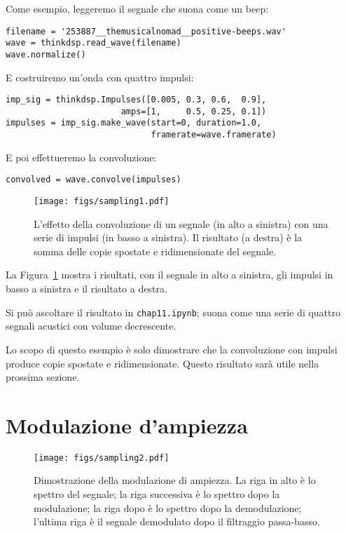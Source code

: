 \documentclass[12pt,a4paper]{book}
\begin{document}
Come esempio, leggeremo il segnale che suona come un beep:

\begin{verbatim} 
filename = '253887__themusicalnomad__positive-beeps.wav'
wave = thinkdsp.read_wave(filename)
wave.normalize()
 \end{verbatim} 

E costruiremo un'onda con quattro impulsi:

\begin{verbatim} 
imp_sig = thinkdsp.Impulses([0.005, 0.3, 0.6,  0.9],
                       amps=[1,     0.5, 0.25, 0.1])
impulses = imp_sig.make_wave(start=0, duration=1.0,
                             framerate=wave.framerate)
 \end{verbatim} 

E poi effettueremo la convoluzione:

\begin{verbatim} 
convolved = wave.convolve(impulses)
 \end{verbatim} 

\begin{figure} 

\centerline{\texttt{[image: figs/sampling1.pdf]}} \caption{L'effetto della convoluzione di un segnale (in alto a sinistra) con una serie di impulsi (in basso a sinistra). Il risultato (a destra) è la somma delle copie spostate e ridimensionate del segnale.} \label{fig.sampling1} \end{figure} 

La Figura~\ref{fig.sampling1} mostra i risultati, con il segnale in alto a sinistra, gli impulsi in basso a sinistra e il risultato a destra.

Si può ascoltare il risultato in {\tt chap11.ipynb}; suona come una serie di quattro segnali acustici con volume decrescente.

Lo scopo di questo esempio è solo dimostrare che la convoluzione con impulsi produce copie spostate e ridimensionate. Questo risultato sarà utile nella prossima sezione.

\section{Modulazione d'ampiezza} \label{am} 

\begin{figure} 

\centerline{\texttt{[image: figs/sampling2.pdf]}} \caption{Dimostrazione della modulazione di ampiezza. La riga in alto è lo spettro del segnale; la riga successiva è lo spettro dopo la modulazione; la riga dopo è lo spettro dopo la demodulazione; l'ultima riga è il segnale demodulato dopo il filtraggio passa-basso.} \label{fig.sampling2} \end{figure} 
\end{document}
